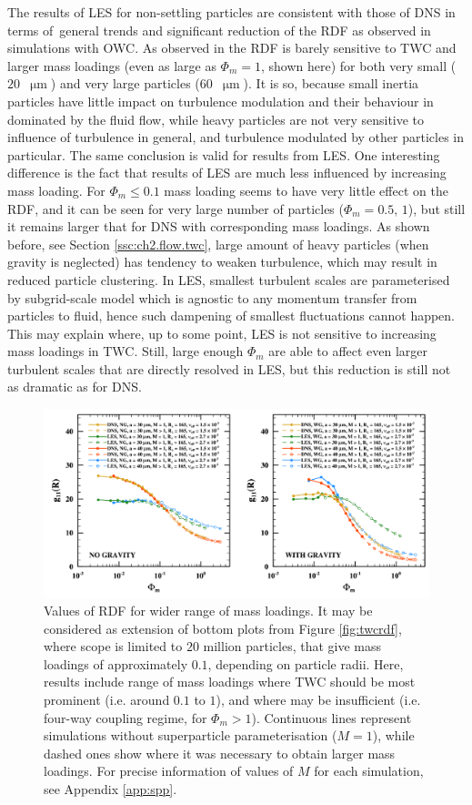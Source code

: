 \documentclass{pracamgren}
\begin{document}
The results of LES for non-settling particles are consistent with those of DNS in terms of~general trends and significant reduction of the RDF as observed in simulations with OWC.
As observed in \textcite{Rosa2020} the RDF is barely sensitive to TWC and larger mass loadings (even as large as $\Phi_m = 1$, shown here) for both very small ($20$~$\upmu\text{m}$) and very large particles ($60$~$\upmu\text{m}$).
It is so, because small inertia particles have little impact on turbulence modulation and their behaviour in dominated by the fluid flow, while heavy particles are not very sensitive to influence of turbulence in general, and turbulence modulated by other particles in particular.
The same conclusion is valid for results from LES.
One interesting difference is the fact that results of LES are much less influenced by increasing mass loading.
For $\Phi_m \le 0.1$ mass loading seems to have very little effect on the RDF, and it can be seen for very large number of particles ($\Phi_m = 0.5, \, 1$), but still it remains larger that for DNS with corresponding mass loadings.
As shown before, see Section \ref{ssc:ch2.flow.twc}, large amount of heavy particles (when gravity is neglected) has tendency to weaken turbulence, which may result in reduced particle clustering.
In LES, smallest turbulent scales are parameterised by subgrid-scale model which is agnostic to any momentum transfer from particles to fluid, hence such dampening of smallest fluctuations cannot happen.
This may explain where, up to some point, LES is not sensitive to increasing mass loadings in TWC.
Still, large enough $\Phi_m$ are able to affect even larger turbulent scales that are directly resolved in LES, but this reduction is still not as dramatic as for DNS.

\begin{figure}[h]
\centering
\includegraphics[width=13.5cm]{img/plots/2-2-3b-twcrdfext.pdf}
\caption{
Values of RDF for wider range of mass loadings.
It may be considered as extension of bottom plots from Figure \ref{fig:twcrdf}, where scope is limited to $20$ million particles, that give mass loadings of approximately $0.1$, depending on particle radii.
Here, results include range of mass loadings where TWC should be most prominent (i.e. around $0.1$ to $1$), and where may be insufficient (i.e. four-way coupling regime, for $\Phi_m > 1$).
Continuous lines represent simulations without superparticle parameterisation ($M=1$), while dashed ones show where it was necessary to obtain larger mass loadings.
For precise information of values of $M$ for each simulation, see Appendix \ref{app:spp}. 
}
\label{fig:twcrdfext}
\end{figure}
\end{document}
